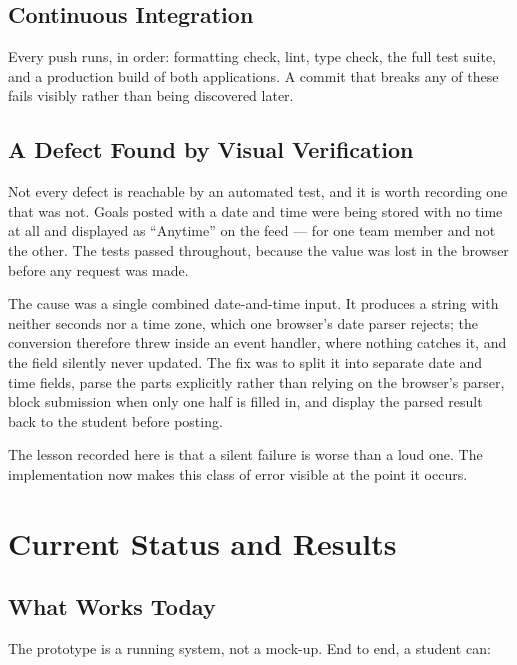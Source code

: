 \documentclass[twoside,12pt]{tietreport}
\begin{document}
\section{Continuous Integration}

Every push runs, in order: formatting check, lint, type check, the full test
suite, and a production build of both applications. A commit that breaks any of
these fails visibly rather than being discovered later.

\section{A Defect Found by Visual Verification}

Not every defect is reachable by an automated test, and it is worth recording one
that was not. Goals posted with a date and time were being stored with no time at
all and displayed as ``Anytime'' on the feed --- for one team member and not the
other. The tests passed throughout, because the value was lost in the browser
before any request was made.

The cause was a single combined date-and-time input. It produces a string with
neither seconds nor a time zone, which one browser's date parser rejects; the
conversion therefore threw inside an event handler, where nothing catches it, and
the field silently never updated. The fix was to split it into separate date and
time fields, parse the parts explicitly rather than relying on the browser's
parser, block submission when only one half is filled in, and display the parsed
result back to the student before posting.

The lesson recorded here is that a silent failure is worse than a loud one. The
implementation now makes this class of error visible at the point it occurs.

\chapter{Current Status and Results}
\label{ch:status}

\section{What Works Today}

The prototype is a running system, not a mock-up. End to end, a student can:
\end{document}
